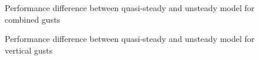 \begin{figure}[h]
  \begin{center}
  \end{center}
  \caption{Performance difference between quasi-steady and unsteady model for combined gusts}
  \label{fig:WG_vs_TG_wt=3}
\end{figure}


\begin{figure}[h]
  \centering
  \caption{Performance difference between quasi-steady and unsteady model for vertical gusts}
  \label{fig:WG_vs_TG_wt=1}
\end{figure}

